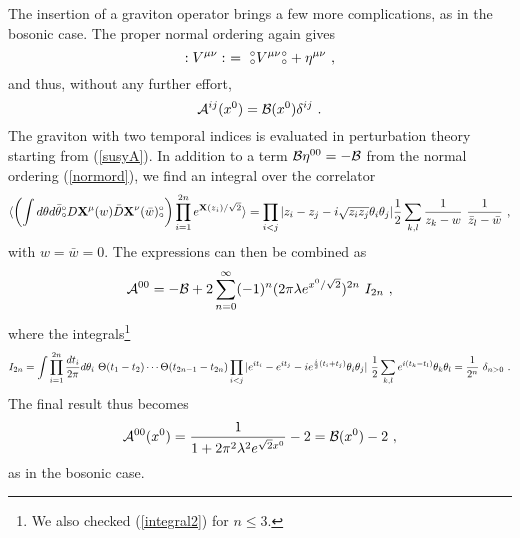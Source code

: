 \documentclass[a4paper,12pt]{article}
\def\no{{}^\circ \hspace{-0.16cm} {}_{\circ}}
\begin{document}
The insertion of a graviton operator brings a few more complications, as in 
the bosonic case. The proper normal ordering again gives
\begin{equation}
: V^{\mu\nu}: ~ = ~\no  V^{\mu\nu} \no + \eta^{\mu\nu}~,
\label{normord}
\end{equation}
and thus, without any further effort, 
\begin{equation}
{\cal A}^{ij}(x^0) = {\cal B}(x^0) \delta^{ij}~.
\label{susyaijres}
\end{equation}
The graviton with two temporal indices is evaluated in perturbation theory
starting from (\ref{susyA}). In addition to a term ${\cal B}\eta^{00}=-{\cal B}$
from the normal ordering (\ref{normord}), we find an integral over the correlator
\begin{eqnarray}
\langle 
\left( \int d \theta d\bar{\theta} 
\no D{\bf X}^\mu(w) {\bar D}{\bf X}^\nu({\bar w}) \no \right) 
\prod_{i=1}^{2n} e^{{\bf X}(z_i)/\sqrt{2}} \rangle = \prod_{i<j} |z_i - z_j 
-i \sqrt{z_i z_j} \theta_i \theta_j|
\frac{1}{2} \sum_{k,l} {1 \over z_k - w}~ {1 \over {\bar z}_l - {\bar w}}~,
\end{eqnarray}
with $w={\bar w}=0$. 
The expressions can then be combined as
\begin{equation}
{\cal A}^{00} =- {\cal B}+ 
2\sum_{n=0}^\infty (-1)^n(2\pi\lambda e^{x^0/\sqrt{2}})^{2n}~I_{2n}~,
\label{susyares}
\end{equation}
where the integrals\footnote{We also checked (\ref{integral2}) for $n \leq3$.}
\begin{equation}
I_{2n}= 
\int \prod_{i=1}^{2n}{dt_i\over 2\pi} d\theta_i  ~ 
\Theta(t_1-t_2) \cdots \Theta(t_{2n-1}-t_{2n})
\prod_{i<j} | e^{it_i}-e^{it_j} - i e^{\frac{i}{2} (t_i+t_j)} \theta_i \theta_j | ~
{1 \over 2} \sum_{k,l}{e^{i(t_k-t_l)}}\theta_k\theta_l
= {1\over 2^n}~\delta_{n>0}~.
\label{integral2}
\end{equation}
The final result thus becomes
\begin{equation}
{\cal A}^{00}(x^0) =  {1\over 1+ 2\pi^2\lambda^2 e^{\sqrt{2}x^0}} - 2  = 
{\cal B}(x^0) - 2 ~,
\end{equation}
as in the bosonic case.
\end{document}
